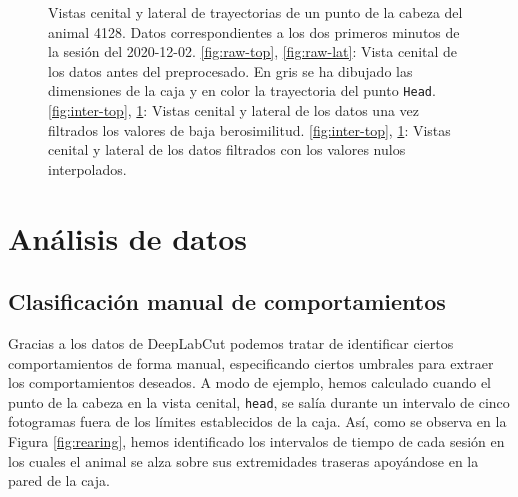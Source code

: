 \begin{figure}[p]
\begin{subfigure}{0.38\textwidth}
    \caption{}
    \label{fig:inter-lat}
  \end{subfigure}
  \caption[Trayectorias durante el preprocesamiento.]{Vistas cenital y lateral de trayectorias de un punto de la cabeza del animal 4128. Datos correspondientes a los dos primeros minutos de la sesión del 2020-12-02. \ref{fig:raw-top}, \ref{fig:raw-lat}: Vista cenital de los datos antes del preprocesado. En gris se ha dibujado las dimensiones de la caja y en color la trayectoria del punto \texttt{Head}. \ref{fig:inter-top}, \ref{fig:inter-lat}: Vistas cenital y lateral de los datos una vez filtrados los valores de baja berosimilitud. \ref{fig:inter-top}, \ref{fig:inter-lat}: Vistas cenital y lateral de los datos filtrados con los valores nulos interpolados. }
  \label{fig:interpolated-trayectories}
\end{figure}





\section{Análisis de datos} \label{sec:análisis}

\subsection{Clasificación manual de comportamientos}
Gracias a los datos de DeepLabCut podemos tratar de identificar ciertos comportamientos de forma manual, especificando ciertos umbrales para extraer los comportamientos deseados. A modo de ejemplo, hemos calculado cuando el punto de la cabeza en la vista cenital, \texttt{head}, se salía durante un intervalo de cinco fotogramas fuera de los límites establecidos de la caja. Así, como se observa en la Figura \ref{fig:rearing}, hemos identificado los intervalos de tiempo de cada sesión en los cuales el animal se alza sobre sus extremidades traseras apoyándose en la pared de la caja.

